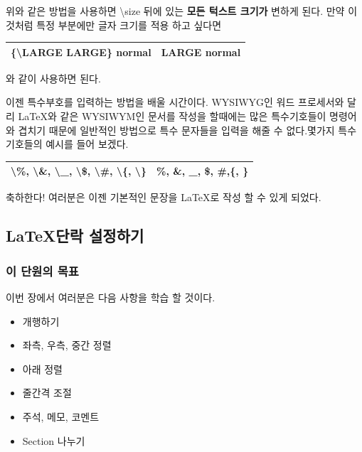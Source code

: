 \documentclass[12pt]{article}
\begin{document}
	위와 같은 방법을 사용하면 \textbackslash size 뒤에 있는 {\bf 모든 턱스트 크기가} 변하게 된다. 만약 {\large 이것처럼} 특정 부분에만 글자 크기를 적용 하고 싶다면 \newline
	
	\begin{tabularx}{\textwidth \doublespacing}{ |X|X| }
		\hline
		\{\textbackslash LARGE LARGE\} normal & {\LARGE LARGE} normal\\
		\hline
	\end{tabularx}
	\newline
	\newline
	와 같이 사용하면 된다.
	\newline
	
	이젠 특수부호를 입력하는 방법을 배울 시간이다. WYSIWYG인 워드 프로세서와 달리 \LaTeX 와 같은 WYSIWYM인 문서를 작성을 할때에는 많은 특수기호들이 명령어와 겹치기 때문에 일반적인 방법으로 특수 문자들을 입력을 해줄 수 없다.몇가지 특수기호들의 예시를 들어 보겠다.\newline
	
	\begin{tabularx}{\textwidth \onehalfspacing}{|X|X|}
		\hline
		\textbackslash \%, \textbackslash \&, \textbackslash \_, \textbackslash \$, \textbackslash \#, \textbackslash \{, \textbackslash\} & \%, \&, \_, \$, \#,\{, \}\\
		\hline
	\end{tabularx}
	\newline
	\newline
	축하한다! 여러분은 이젠 기본적인 문장을 \LaTeX 로 작성 할 수 있게 되었다.
	\clearpage
	
	\subsection{\LaTeX 단락 설정하기}
	\subsubsection{이 단원의 목표}
	이번 장에서 여러분은 다음 사항을 학습 할 것이다.
	\begin{itemize}
		\item 개행하기
		\item 좌측, 우측, 중간 정렬
		\item 아래 정렬
		\item 줄간격 조절
		\item 주석, 메모, 코멘트
		\item Section 나누기
	\end{itemize} 
\end{document}
